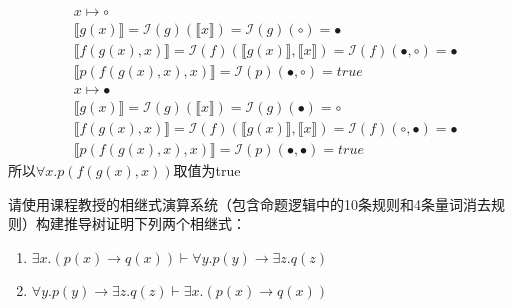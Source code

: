 \documentclass[11pt,a4paper]{article}
\newcommand{\interpretation}{\mathcal{I}}
\begin{document}
\begin{solution}
	\begin{align*}
		&x\mapsto \circ \\
		&\llbracket g(x)\rrbracket=\interpretation(g)(\llbracket x\rrbracket)=\interpretation(g)(\circ)=\bullet \\
		&\llbracket f(g(x),x)\rrbracket=\interpretation(f)(\llbracket g(x)\rrbracket,\llbracket x\rrbracket)=\interpretation(f)(\bullet,\circ)=\bullet \\
		&\llbracket p(f(g(x),x),x)\rrbracket=\interpretation(p)(\bullet,\circ)=true \\
    	&x\mapsto \bullet \\
    	&\llbracket g(x)\rrbracket=\interpretation(g)(\llbracket x\rrbracket)=\interpretation(g)(\bullet)=\circ \\
		&\llbracket f(g(x),x)\rrbracket=\interpretation(f)(\llbracket g(x)\rrbracket,\llbracket x\rrbracket)=\interpretation(f)(\circ,\bullet)=\bullet \\
		&\llbracket p(f(g(x),x),x)\rrbracket=\interpretation(p)(\bullet,\bullet)=true
	\end{align*}
	所以$\forall x.p(f(g(x),x))$取值为true \\
\end{solution}

\subproblem 请使用课程教授的相继式演算系统（包含命题逻辑中的10条规则和4条量词消去规则）构建推导树证明下列两个相继式：
\begin{enumerate}
    \item $\exists x.(p(x)\rightarrow q(x)) \vdash \forall y.p(y) \rightarrow \exists z.q(z)$
    \item $\forall y.p(y)\rightarrow \exists z.q(z) \vdash \exists x.(p(x)\rightarrow q(x))$
\end{enumerate}
\end{document}
